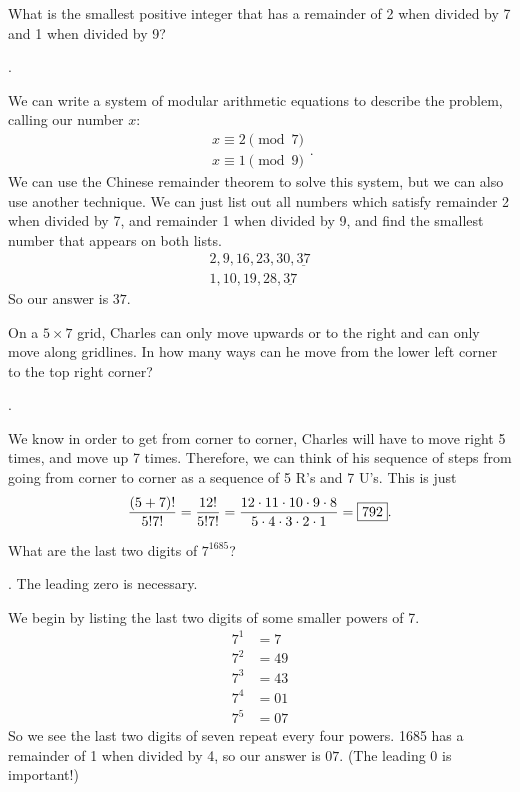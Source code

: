 \documentclass[11pt]{article}
\DeclareRobustCommand{\frac}[3][0pt]{%
  {\begingroup\hspace{#1}#2\hspace{#1}\endgroup\over\hspace{#1}#3\hspace{#1}}}
\begin{document}
\begin{problem}What is the smallest positive integer that has a remainder of 2 when divided by 7 and 1 when divided by 9?
\end{problem}
\begin{answer}
.
\end{answer}
\begin{solution}
We can write a system of modular arithmetic equations to describe the problem, calling our number $x$:
$$ \begin{array}{ll}
              	x \equiv 2 \pmod{7}\\
              	x \equiv 1 \pmod{9}
            	\end{array}
.
$$
We can use the Chinese remainder theorem to solve this system, but we can also use another technique. We can just list out all numbers which satisfy remainder 2 when divided by 7, and remainder 1 when divided by 9, and find the smallest number that appears on both lists.
\begin{align*}
2, 9, 16, 23, 30, \underline{37} \\
1, 10, 19, 28, \underline{37}
\end{align*}
So our answer is $\boxed{37}$.
\end{solution}

\begin{problem}On a $5 \times 7$ grid, Charles can only move upwards or to the right and can only move along gridlines. In how many ways can he move from the lower left corner to the top right corner?
\end{problem}
\begin{answer}
.
\end{answer}
\begin{solution}
We know in order to get from corner to corner, Charles will have to move right 5 times, and move up 7 times. Therefore, we can think of his sequence of steps from going from corner to corner as a sequence of 5 R's and 7 U's. This is just
$$\frac{(5+7)!}{5!7!}=\frac{12!}{5!7!} = \frac{12 \cdot 11 \cdot 10 \cdot 9 \cdot 8}{5 \cdot 4 \cdot 3 \cdot 2 \cdot 1} = \boxed{792}.$$
\end{solution}

\begin{problem}What are the last two digits of $7^{1685}$?
\end{problem}
\begin{answer}
. The leading zero is necessary.
\end{answer}
\begin{solution}
We begin by listing the last two digits of some smaller powers of 7.
\begin{align*}
7^1 &= 7 \\
7^2 &= 49 \\
7^3 &= 43 \\
7^4 &= 01 \\
7^5 &= 07
\end{align*}
So we see the last two digits of seven repeat every four powers. 1685 has a remainder of 1 when divided by 4, so our answer is $\boxed{07}$. (The leading 0 is important!)
\end{solution}
\end{document}
